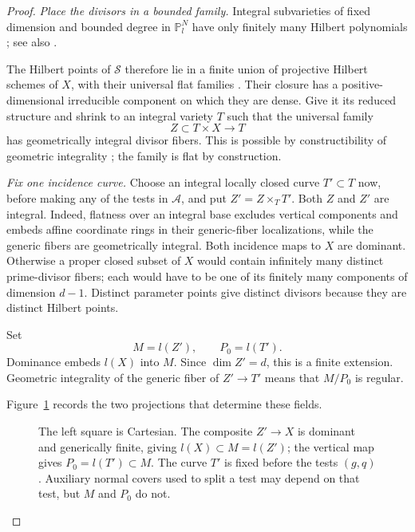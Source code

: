 \begin{proof}
\emph{Place the divisors in a bounded family.}
Integral subvarieties of fixed dimension and bounded degree in
$\mathbb P^N_l$ have only finitely many Hilbert polynomials
\cite[Section~2 and Lemma~2.4]{GrothHilbert1961}; see also
\cite[Proposition~5.3]{Tanaka2023}.

The Hilbert points of $\mathcal S$ therefore lie in a finite union of
projective Hilbert schemes of $X$, with their universal flat families
\cite[Theorem~3.2 and the Hilbert specialization after Proposition~3.8]{GrothHilbert1961}.
Their closure has a positive-dimensional
irreducible component on which they are dense. Give it its reduced
structure and shrink to an integral variety $T$ such that the universal
family
\[
 Z\subset T\times X\longrightarrow T
\]
has geometrically integral divisor fibers. This is possible by
constructibility of geometric integrality
\cite[Tags 0579, 055B]{Stacks}; the family is flat by construction.

\emph{Fix one incidence curve.}
Choose an integral locally closed curve $T'\subset T$ now, before
making any of the tests in $\mathcal A$, and put $Z'=Z\times_T T'$.
Both $Z$ and $Z'$ are integral. Indeed, flatness over an integral base
excludes vertical components and embeds affine coordinate rings in
their generic-fiber localizations, while the generic fibers are
geometrically integral. Both incidence maps to $X$ are dominant.
Otherwise a proper closed subset of $X$ would contain infinitely many
distinct prime-divisor fibers; each would have to be one of its
finitely many components of dimension $d-1$. Distinct parameter points
give distinct divisors because they are distinct Hilbert points.

Set
\[
 M=l(Z'),\qquad P_0=l(T').
\]
Dominance embeds $l(X)$ into $M$. Since $\dim Z'=d$, this is a finite
extension. Geometric integrality of the generic fiber of $Z'\to T'$
means that $M/P_0$ is regular.

Figure~\ref{fig:incidence} records the two projections that determine
these fields.
\begin{figure}[htbp]
\centering
{}
\caption{The left square is Cartesian. The composite $Z'\to X$ is
dominant and generically finite, giving $l(X)\subset M=l(Z')$;
the vertical map gives $P_0=l(T')\subset M$. The curve $T'$ is fixed
before the tests $(g,q)$. Auxiliary normal covers used to split a test
may depend on that test, but $M$ and $P_0$ do not.}
\label{fig:incidence}
\end{figure}


\end{proof}
